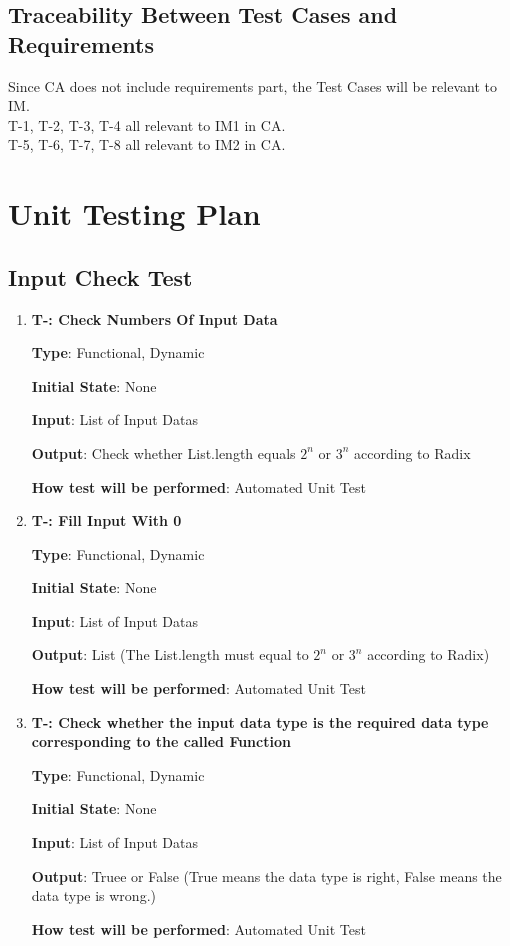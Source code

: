 \documentclass[12pt, titlepage]{article}
\newcounter{tnum}
\begin{document}

\subsection{Traceability Between Test Cases and Requirements}
Since CA does not include requirements part, the Test Cases will be relevant to IM.\\
T-1, T-2, T-3, T-4 all relevant to IM1 in CA.\\
T-5, T-6, T-7, T-8 all relevant to IM2 in CA.\\			
\section{Unit Testing Plan}
\subsection{Input Check Test}

\begin{enumerate}

\item{\textbf{T-\thetnum \label{CNI}: Check Numbers Of Input Data}}

\textbf {Type}: Functional, Dynamic
					
\textbf {Initial State}: None
					
\textbf {Input}: List of Input Datas
					
\textbf {Output}: Check whether List.length equals $2^n$ or $3^n$ according to Radix
					
\textbf {How test will be performed}: Automated Unit Test


\item{\textbf{T-\thetnum \label{FZ}: Fill Input With 0}}

\textbf {Type}: Functional, Dynamic
					
\textbf {Initial State}: None
					
\textbf {Input}: List of Input Datas 
					
\textbf {Output}: List (The List.length must equal to $2^n$ or $3^n$ according to Radix)
					
\textbf {How test will be performed}:  Automated Unit Test


\item{\textbf{T-\thetnum \label{DTC}: Check whether the input data type is the required data type corresponding to the called Function}}

\textbf {Type}: Functional, Dynamic
					
\textbf {Initial State}: None
					
\textbf {Input}:  List of Input Datas
					
\textbf {Output}: Truee  or False (True means the data type is right, False means the data type is wrong.)
					
\textbf {How test will be performed}:  Automated Unit Test


\end{enumerate}		
\end{document}
